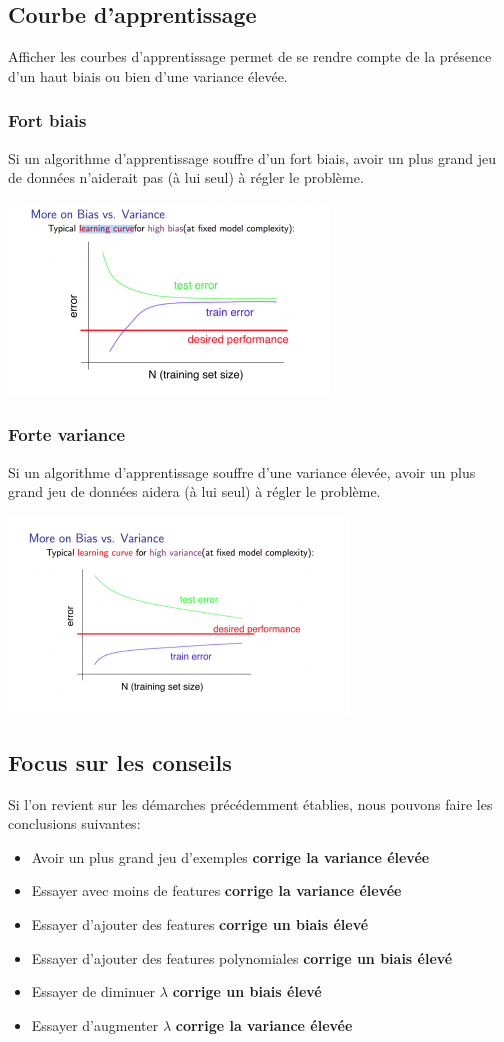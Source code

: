 \documentclass{article}
\theoremstyle{definition}
\begin{document}
\subsection{Courbe d'apprentissage}
Afficher les courbes d'apprentissage permet de se rendre compte de la présence d'un haut biais ou bien d'une variance élevée.
\subsubsection{Fort biais}
Si un algorithme d'apprentissage souffre d'un fort biais, avoir un plus grand jeu de données n'aiderait pas (à lui seul) à régler le problème. \par
\includegraphics{highbias}
\subsubsection{Forte variance}
Si un algorithme d'apprentissage souffre d'une variance élevée, avoir un plus grand jeu de données aidera (à lui seul) à régler le problème. \par
\includegraphics{highvariance}
\subsection{Focus sur les conseils}
Si l'on revient sur les démarches précédemment établies, nous pouvons faire les conclusions suivantes:
\begin{itemize}
\item Avoir un plus grand jeu d'exemples \textbf{corrige la variance élevée}
\item Essayer avec moins de features \textbf{corrige la variance élevée}
\item Essayer d'ajouter des features \textbf{corrige un biais élevé}
\item Essayer d'ajouter des features polynomiales  \textbf{corrige un biais élevé}
\item Essayer de diminuer $\lambda$ \textbf{corrige un biais élevé}
\item Essayer d'augmenter $\lambda$ \textbf{corrige la variance élevée}
\end{itemize}
\end{document}
